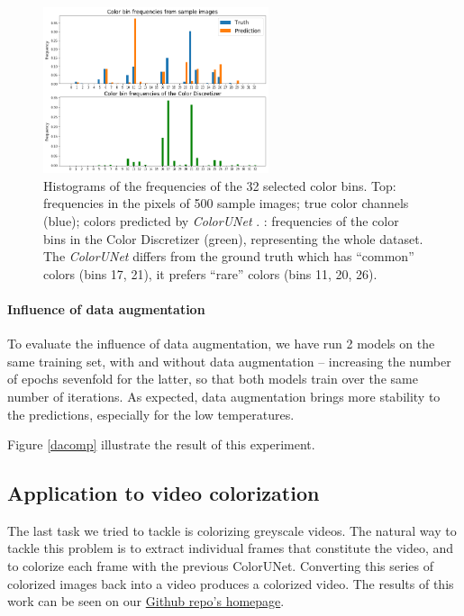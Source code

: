 \documentclass[10pt,twocolumn,letterpaper]{article}
\begin{document}
\begin{figure}
\begin{center}
\includegraphics[width=250px]{color_histogram}
\caption{Histograms of the frequencies of the 32 selected color bins. Top: frequencies in the pixels of 500 sample images; true color channels (blue); colors predicted by \textit{ColorUNet} . : frequencies of the color bins in the Color Discretizer (green), representing the whole dataset. The \textit{ColorUNet} differs from the ground truth which has ``common'' colors (bins 17, 21), it prefers ``rare'' colors (bins 11, 20, 26). }
\label{histogram}
\end{center}
\end{figure}


\paragraph{Influence of data augmentation}

To evaluate the influence of data augmentation, we have run 2 models on the same training set, with and without data augmentation -- increasing the number of epochs sevenfold for the latter, so that both models train over the same number of iterations. As expected, data augmentation brings more stability to the predictions, especially for the low temperatures. 

Figure \ref{dacomp} illustrate the result of this experiment. 

\subsection{Application to video colorization}

The last task we tried to tackle is colorizing greyscale videos. The natural way to tackle this problem is to extract individual frames that constitute the video, and to colorize each frame with the previous ColorUNet. Converting this series of colorized images back into a video produces a colorized video. The results of this work can be seen on our \href{https://github.com/vincentbillaut/all-colors-matter}{Github repo's homepage}.
\end{document}
